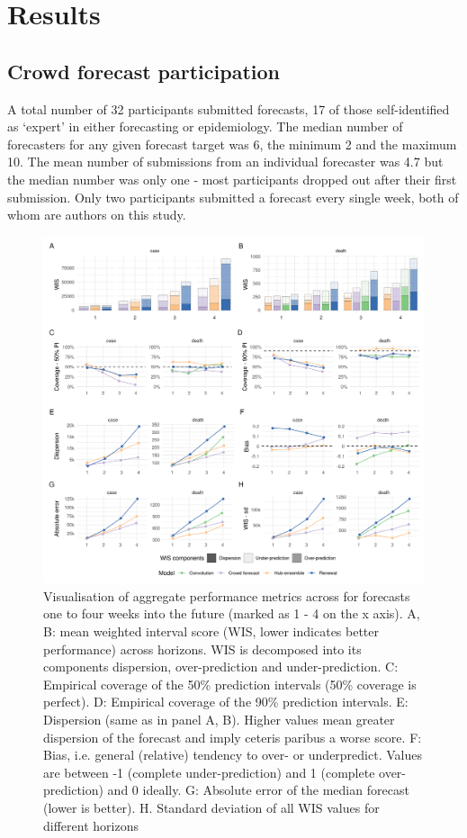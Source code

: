 \documentclass[
]{article}
\begin{document}
\hypertarget{results}{%
\section{Results}\label{results}}

\hypertarget{crowd-forecast-participation}{%
\subsection{Crowd forecast participation}\label{crowd-forecast-participation}}

A total number of 32 participants submitted forecasts, 17 of those self-identified as `expert' in either forecasting or epidemiology. The median number of forecasters for any given forecast target was 6, the minimum 2 and the maximum 10. The mean number of submissions from an individual forecaster was 4.7 but the median number was only one - most participants dropped out after their first submission. Only two participants submitted a forecast every single week, both of whom are authors on this study.

\begin{figure}[H]
\includegraphics[width=1\linewidth,]{../analysis/plots/aggregate-performance-all-v4} \caption{Visualisation of aggregate performance metrics across for forecasts one to four weeks into the future (marked as 1 - 4 on the x axis). A, B: mean weighted interval score (WIS, lower indicates better performance) across horizons. WIS is decomposed into its components dispersion, over-prediction and under-prediction. C: Empirical coverage of the 50\% prediction intervals (50\% coverage is perfect). D: Empirical coverage of the 90\% prediction intervals. E: Dispersion (same as in panel A, B). Higher values mean greater dispersion of the forecast and imply ceteris paribus a worse score. F: Bias, i.e. general (relative) tendency to over- or underpredict. Values are between -1 (complete under-prediction) and 1 (complete over-prediction) and 0 ideally. G: Absolute error of the median forecast (lower is better). H. Standard deviation of all WIS values for different horizons}\label{fig:agg-performance-all}
\end{figure}
\end{document}
